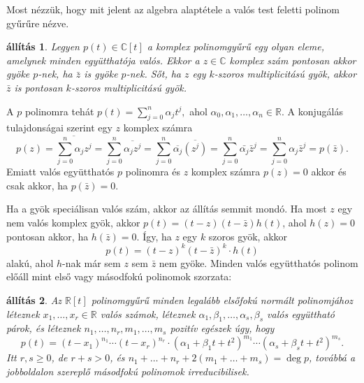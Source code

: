\documentclass[9pt, a4paper, showtrims]{memoir}
\makeatletter
\renewenvironment{proof}[1][\proofname]
    {\par\pushQED{\qed}%
    \normalfont \topsep6\p@\@plus6\p@\relax
    \trivlist
    \item[\hskip\labelsep
        \itshape
    #1\@addpunct{:}]\ignorespaces}
    {\popQED\endtrivlist\@endpefalse}
\theoremstyle{plain}
\newtheorem{proposition}{állítás}[chapter]
\theoremstyle{remark}
\theoremstyle{definition}
\makeatother
\begin{document}
Most nézzük, hogy mit jelent az algebra alaptétele a valós test feletti polinom gyűrűre nézve.
\begin{proposition}
    Legyen $p\left( t \right)\in\mathbb{C}[t]$ a komplex polinomgyűrű egy olyan eleme, 
    amelynek minden együtthatója valós.
    Ekkor a $z\in \mathbb{C}$ komplex szám pontosan akkor gyöke $p$-nek, 
    ha $\bar{z}$ is gyöke $p$-nek.
    Sőt, ha $z$ egy $k$-szoros multiplicitású gyök, 
    akkor $\bar{z}$ is pontosan $k$-szoros multiplicitású gyök.
\end{proposition}
\begin{proof}
    A $p$ polinomra tehát 
    \begin{math}
        p\left( t \right)
        =
        \sum_{j=0}^n\alpha_jt^j,
    \end{math}
    ahol $\alpha_0,\alpha_1,\dots,\alpha_n\in\mathbb{R}$.
    A konjugálás tulajdonságai szerint egy $z$ komplex számra
    \[
        p\left( z \right)=
        \overline{
            \sum_{j=0}^n\alpha_jz^j
        }
        =
        \sum_{j=0}^n\overline{\alpha_jz^j}
        =
        \sum_{j=0}^n\overline{\alpha_j}\overline{(z^j)}
        =
        \sum_{j=0}^n\bar{\alpha_j}\bar{z}^j
        =
        \sum_{j=0}^n\alpha_j\bar{z}^j
        =
        p\left(\bar{z} \right).
    \]
    Emiatt valós együtthatós $p$ polinomra és $z$ komplex számra 
    $p\left( z \right)=0$ akkor és csak akkor, ha $p\left( \bar{z} \right)=0.$

    Ha a gyök speciálisan valós szám, akkor az állítás semmit mondó.
    Ha most $z$ egy nem valós komplex gyök,
    akkor $p(t)=\left( t-z \right)\left( t-\bar{z} \right)h\left( t \right)$, ahol 
    $h\left( z \right)=0$ pontosan akkor, ha $h\left( \bar{z} \right)=0$.
    Így, ha $z$ egy $k$ szoros gyök,
    akkor
    \[
        p\left( t \right)=\left( t-z \right)^{k}\left( t-\bar{z} \right)^{k}\cdot h\left( t \right)
    \]
    alakú, ahol $h$-nak már sem $z$ sem $\bar{z}$ nem gyöke.
\end{proof}
Minden valós együtthatós polinom előáll mint első vagy másodfokú polinomok szorzata:
\begin{proposition}\label{pr:RealPolFact}
    Az $\mathbb{R}[t]$ polinomgyűrű minden legalább elsőfokú normált polinomjához
    léteznek $x_1,\dots,x_r\in\mathbb{R}$ valós számok,
léteznek $\alpha_1,\beta_1,\dots,\alpha_s,\beta_s$ valós együttható párok, 
    és léteznek
    $n_1,\dots,n_r, m_1,\dots,m_s$ pozitív egészek úgy, hogy
    \[
        p\left( t \right)
        =
        \left( t-x_1 \right)^{n_1}
        \cdots
        \left( t-x_r \right)^{n_r}
        \cdot
        \left(\alpha_1 + \beta_1t +t^2\right)^{m_1}
        \cdots
        \left(\alpha_s + \beta_st +t^2\right)^{m_s}.
    \]
    Itt $r,s\geq 0$, de $r+s>0$, és $n_1+\dots+n_r+2\left( m_1+\dots+m_s \right)=\deg p$, 
    továbbá a jobboldalon szereplő másodfokú polinomok irreducibilisek.
\end{proposition}
\end{document}
